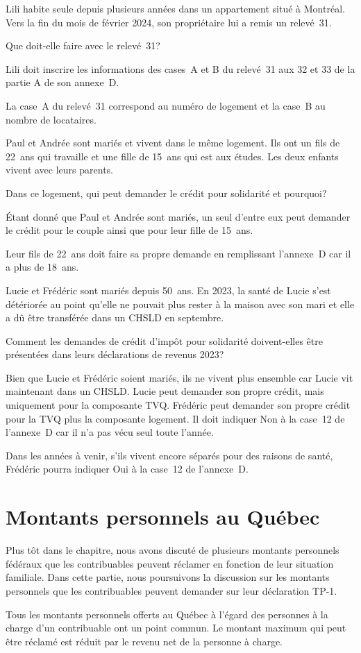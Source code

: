 \begin{question}
	Lili habite seule depuis plusieurs années dans un appartement situé à Montréal. Vers la fin du mois de février 2024, son propriétaire lui a remis un relevé~31.
	
	Que doit-elle faire avec le relevé~31?
\end{question}
Lili doit inscrire les informations des cases~A et B du relevé~31 aux 32 et 33 de la partie A de son annexe~D.

La case~A du relevé~31 correspond au numéro de logement et la case~B au nombre de locataires.

\begin{question}
	Paul et Andrée sont mariés et vivent dans le même logement. Ils ont un fils de 22~ans qui travaille et une fille de 15~ans qui est aux études. Les deux enfants vivent avec leurs parents.
	
	Dans ce logement, qui peut demander le crédit pour solidarité et pourquoi?
\end{question}
Étant donné que Paul et Andrée sont mariés, un seul d'entre eux peut demander le crédit pour le couple ainsi que pour leur fille de 15~ans. 

Leur fils de 22~ans doit faire sa propre demande en remplissant l'annexe~D car il a plus de 18~ans.

\begin{question}
	Lucie et Frédéric sont mariés depuis 50~ans. En 2023, la santé de Lucie s'est détériorée au point qu'elle ne pouvait plus rester à la maison avec son mari et elle a dû être transférée dans un CHSLD en septembre. 
	
	Comment les demandes de crédit d'impôt pour solidarité doivent-elles être présentées dans leurs déclarations de revenus 2023?
\end{question}
Bien que Lucie et Frédéric soient mariés, ils ne vivent plus ensemble car Lucie vit maintenant dans un CHSLD. Lucie peut demander son propre crédit, mais uniquement pour la composante TVQ. Frédéric peut demander son propre crédit pour la TVQ plus la composante logement. Il doit indiquer \og Non\fg{} à la case~12 de l'annexe~D car il n'a pas vécu seul toute l'année.

Dans les années à venir, s'ils vivent encore séparés pour des raisons de santé, Frédéric pourra indiquer \og Oui\fg{} à la case~12 de l'annexe~D.



\section{Montants personnels au Québec}
\begin{intro}
	Plus tôt dans le chapitre, nous avons discuté de plusieurs montants personnels fédéraux que les contribuables peuvent réclamer en fonction de leur situation familiale. Dans cette partie, nous poursuivons la discussion sur les montants personnels que les contribuables peuvent demander sur leur déclaration TP-1.
\end{intro}
Tous les montants personnels offerts au Québec à l'égard des personnes à la charge d'un contribuable ont un point commun. Le montant maximum qui peut être réclamé est réduit par le revenu net de la personne à charge.


